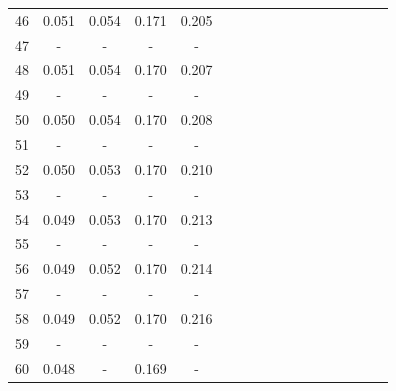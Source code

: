 \documentclass{report}
\begin{document}
\begin{appendices}
\begin{table}
\begin{tabular}{|c|cccc|cccc|cccc|cccc|}
46 & 0.051 & 0.054 & 0.171 & 0.205 & & & & & & & & & & & &\\
47 &   -   &   -   &   -   &   -   & & & & & & & & & & & &\\
48 & 0.051 & 0.054 & 0.170 & 0.207 & & & & & & & & & & & &\\
49 &   -   &   -   &   -   &   -   & & & & & & & & & & & &\\
50 & 0.050 & 0.054 & 0.170 & 0.208 & & & & & & & & & & & &\\
51 &   -   &   -   &   -   &   -   & & & & & & & & & & & &\\
52 & 0.050 & 0.053 & 0.170 & 0.210 & & & & & & & & & & & &\\
53 &   -   &   -   &   -   &   -   & & & & & & & & & & & &\\
54 & 0.049 & 0.053 & 0.170 & 0.213 & & & & & & & & & & & &\\
55 &   -   &   -   &   -   &   -   & & & & & & & & & & & &\\
56 & 0.049 & 0.052 & 0.170 & 0.214 & & & & & & & & & & & &\\
57 &   -   &   -   &   -   &   -   & & & & & & & & & & & &\\
58 & 0.049 & 0.052 & 0.170 & 0.216 & & & & & & & & & & & &\\
59 &   -   &   -   &   -   &   -   & & & & & & & & & & & &\\
60 & 0.048 &   -   & 0.169 &   -   & & & & & & & & & & & &\\
\hline
\end{tabular}
\end{table}


\end{appendices}
\end{document}
